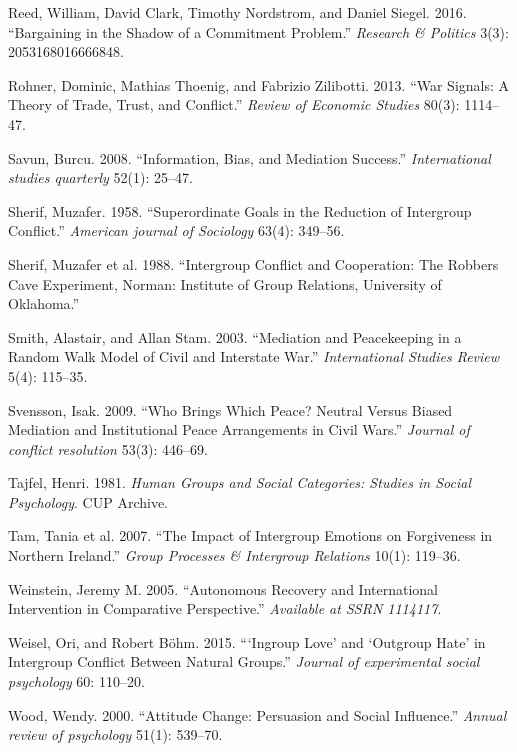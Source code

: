 \documentclass[11pt]{article}
\begin{document}
\hypertarget{ref-reed2016bargaining}{}
Reed, William, David Clark, Timothy Nordstrom, and Daniel Siegel. 2016.
``Bargaining in the Shadow of a Commitment Problem.'' \emph{Research \&
Politics} 3(3): 2053168016666848.

\hypertarget{ref-rohner2013war}{}
Rohner, Dominic, Mathias Thoenig, and Fabrizio Zilibotti. 2013. ``War
Signals: A Theory of Trade, Trust, and Conflict.'' \emph{Review of
Economic Studies} 80(3): 1114--47.

\hypertarget{ref-savun2008information}{}
Savun, Burcu. 2008. ``Information, Bias, and Mediation Success.''
\emph{International studies quarterly} 52(1): 25--47.

\hypertarget{ref-sherif1958superordinate}{}
Sherif, Muzafer. 1958. ``Superordinate Goals in the Reduction of
Intergroup Conflict.'' \emph{American journal of Sociology} 63(4):
349--56.

\hypertarget{ref-Sherif1988robbersCave}{}
Sherif, Muzafer et al. 1988. ``Intergroup Conflict and Cooperation: The
Robbers Cave Experiment, Norman: Institute of Group Relations,
University of Oklahoma.''

\hypertarget{ref-smith2003mediation}{}
Smith, Alastair, and Allan Stam. 2003. ``Mediation and Peacekeeping in a
Random Walk Model of Civil and Interstate War.'' \emph{International
Studies Review} 5(4): 115--35.

\hypertarget{ref-svensson2009brings}{}
Svensson, Isak. 2009. ``Who Brings Which Peace? Neutral Versus Biased
Mediation and Institutional Peace Arrangements in Civil Wars.''
\emph{Journal of conflict resolution} 53(3): 446--69.

\hypertarget{ref-tajfel1981groups}{}
Tajfel, Henri. 1981. \emph{Human Groups and Social Categories: Studies
in Social Psychology}. CUP Archive.

\hypertarget{ref-tam2007impact}{}
Tam, Tania et al. 2007. ``The Impact of Intergroup Emotions on
Forgiveness in Northern Ireland.'' \emph{Group Processes \& Intergroup
Relations} 10(1): 119--36.

\hypertarget{ref-weinstein2005autonomous}{}
Weinstein, Jeremy M. 2005. ``Autonomous Recovery and International
Intervention in Comparative Perspective.'' \emph{Available at SSRN
1114117}.

\hypertarget{ref-weisel2015ingroup}{}
Weisel, Ori, and Robert Böhm. 2015. ```Ingroup Love' and `Outgroup Hate'
in Intergroup Conflict Between Natural Groups.'' \emph{Journal of
experimental social psychology} 60: 110--20.

\hypertarget{ref-wood2000attitude}{}
Wood, Wendy. 2000. ``Attitude Change: Persuasion and Social Influence.''
\emph{Annual review of psychology} 51(1): 539--70.
\end{document}
